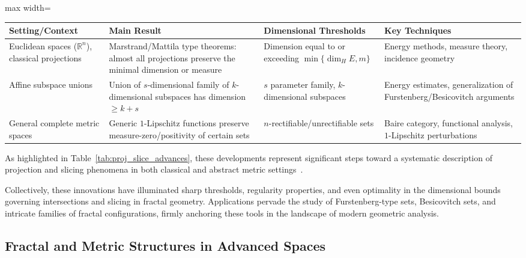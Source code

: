 \begin{table*}[htbp]
\centering
\caption{Recent Advances in Projection and Slicing Theorems}
\label{tab:proj_slice_advances}
\begin{adjustbox}{max width=\textwidth}
\begin{tabular}{llll}
\toprule
\textbf{Setting/Context} & \textbf{Main Result} & \textbf{Dimensional Thresholds} & \textbf{Key Techniques} \\
\midrule
Euclidean spaces ($\mathbb{R}^n$), classical projections & Marstrand/Mattila type theorems: almost all projections preserve the minimal dimension or measure & Dimension equal to or exceeding $\min\{\dim_H E, m\}$ & Energy methods, measure theory, incidence geometry \\
Affine subspace unions & Union of $s$-dimensional family of $k$-dimensional subspaces has dimension $\geq k+s$ & $s$ parameter family, $k$-dimensional subspaces & Energy estimates, generalization of Furstenberg/Besicovitch arguments \\
General complete metric spaces & Generic $1$-Lipschitz functions preserve measure-zero/positivity of certain sets & $n$-rectifiable/unrectifiable sets & Baire category, functional analysis, $1$-Lipschitz perturbations \\
\bottomrule
\end{tabular}
\end{adjustbox}
\end{table*}

As highlighted in Table~\ref{tab:proj_slice_advances}, these developments represent significant steps toward a systematic description of projection and slicing phenomena in both classical and abstract metric settings~\cite{ref74, ref21, ref75}.

Collectively, these innovations have illuminated sharp thresholds, regularity properties, and even optimality in the dimensional bounds governing intersections and slicing in fractal geometry. Applications pervade the study of Furstenberg-type sets, Besicovitch sets, and intricate families of fractal configurations, firmly anchoring these tools in the landscape of modern geometric analysis.

\subsection{Fractal and Metric Structures in Advanced Spaces}

